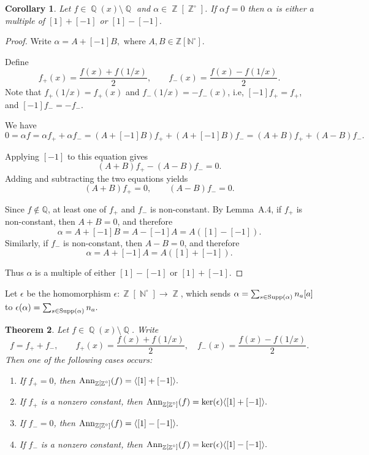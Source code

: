 \documentclass[12t,a4paper]{amsart}
\newtheorem{thm}{Theorem}[section]
\newtheorem{cor}[thm]{Corollary}
\theoremstyle{definition}
\DeclareMathOperator{\Z}{\mathbb{Z}}
\DeclareMathOperator{\N}{\mathbb{N}}
\DeclareMathOperator{\Q}{\mathbb{Q}}
\DeclareMathOperator{\supp}{{\rm Supp}}
\newcommand{\Ann}{{\rm Ann}}
\numberwithin{equation}{section}
\begin{document}
{\begin{cor} 
Let $f\in \Q(x)\setminus\Q $ and $\alpha\in \Z[\Z^\circ]$. If $\alpha f=0$ then  $\alpha$ is either a multiple of $[1]+[-1]$ or $[1]-[-1].$
    \end{cor}
\begin{proof}
Write
\(
\alpha=A+[-1]B,
\)
where \(A,B\in \mathbb Z[\mathbb N^\circ]\).

Define
\[
f_{+}(x)=\dfrac{f(x)+f(1/x)}{2}, \qquad
f_{-}(x)=\dfrac{f(x)-f(1/x)}{2}.
\]
Note that $f_{+}(1/x)=f_+(x)$ and $f_{-}(1/x)=-f_{-}(x)$, i.e, $[-1]f_{+}=f_{+}$, and  $[-1]f_{-}=-f_{-}$.

 We have
\[
0=\alpha f=\alpha f_{+}+\alpha f_{-}=(A+[-1]B)f_{+} +(A+[-1]B)f_{-}=(A+B)f_{+}+(A-B)f_{-}.
\]


Applying \([-1]\) to this equation gives
\[
(A+B)f_{+}-(A-B)f_{-}=0.
\]
Adding and subtracting the two equations yields
\[
(A+B)f_{+}=0,
\qquad
(A-B)f_{-}=0.
\]

Since \(f\notin \mathbb Q\), at least one of \(f_{+}\) and \(f_{-}\) is {non-constant}. By Lemma~A.4, if
\(f_{+}\) is non-constant, then \(A+B=0\), and therefore
\[
\alpha=A+[-1]B=A-[-1]A=A([1]-[-1]).
\]
Similarly, if \(f_{-}\) is non-constant, then \(A-B=0\), and therefore
\[
\alpha=A+[-1]A=A([1]+[-1]).
\]

Thus \(\alpha\) is a multiple of either \([1]-[-1]\) or \([1]+[-1]\).
\end{proof}


Let $\epsilon$ be the homomorphism $\epsilon\colon \Z[\N^\circ]\to \Z$, which sends $\alpha=\sum_{s\in {\supp(\alpha)}} n_a[a]$ to $\epsilon(\alpha)= \sum_{s\in \supp(\alpha)} n_a.$


\begin{thm}
Let $f\in \Q(x)\setminus \Q$. Write
\[
f=f_+ + f_-,
\qquad
f_+(x)=\frac{f(x)+f(1/x)}2,\quad
f_-(x)=\frac{f(x)-f(1/x)}2.
\]
 Then one of the following cases occurs:
\begin{enumerate}
    \item If $f_+=0$, then     \(    \Ann_{\Z[\Z^\circ]}(f)=\langle [1]+[-1]\rangle.    \)

    \item If $f_+$ is a nonzero constant, then     \(     \Ann_{\Z[\Z^\circ]}(f)=\ker(\epsilon)\langle [1]+[-1]\rangle.    \)

    \item If $f_-=0$, then     \(     \Ann_{\mathbb Z[\mathbb Z^\circ]}(f)=\langle [1]-[-1]\rangle.    \)

    \item If $f_-$ is a nonzero constant, then     \(    \Ann_{\Z[\Z^\circ]}(f)=\ker(\epsilon)\langle [1]-[-1]\rangle.     \)


\end{enumerate}
\end{thm}}
\end{document}
